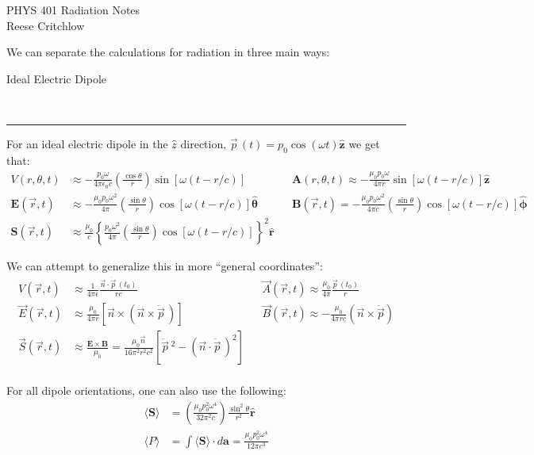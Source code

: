 \documentclass{article}
\newcommand{\header}[1]{\begin{large}\noindent #1\end{large}\\\rule{\textwidth}{0.5pt}}
\newcommand{\gap}{\medskip\\}
\newcommand{\curly}[1]{\left\{#1\right\}}
\begin{document}
\begin{center}
    \Large PHYS 401 Radiation Notes\\
    \normalsize Reese Critchlow
\end{center}
    
We can separate the calculations for radiation in three main ways:
\gap
\header{Ideal Electric Dipole}
For an ideal electric dipole in the $\hat{z}$ direction, $\vec{p}\,(t) = p_0\cos(\omega t)\hat{\pmb{z}}$ we get that:
\begin{align*}
    V(r, \theta, t) &\approx -\frac{p_0 \omega}{4\pi \epsilon_0c}\left(\frac{\cos \theta}{r}\right) \sin \left[\omega(t- r/c)\right]
    && \mathbf{A}(r, \theta, t) \approx -\frac{\mu_0 p_0 \omega}{4\pi r} \sin \left[\omega(t - r/c)\right]\hat{\pmb{z}}\\
    \mathbf{E}(\vec{r}, t) &\approx -\frac{\mu_0 p_0 \omega^2}{4\pi}\left(\frac{\sin\theta}{r}\right)\cos\left[\omega(t- r/c)\right] \hat{\pmb{\theta}}
    && \mathbf{B}(\vec{r}, t) = - \frac{\mu_0 p_0 \omega^2}{4\pi c}\left(\frac{\sin\theta}{r}\right)\cos\left[\omega(t- r/c)\right]\hat{\pmb{\phi}}\\
    \mathbf{S}(\vec{r}, t) &\approx \frac{\mu_0}{c}\curly{\frac{p_0\omega^2}{4\pi} \left(\frac{\sin\theta}{r}\right)\cos[\omega(t-r/c)]}^2 \hat{\pmb{r}}
\end{align*}

We can attempt to generalize this in more ``general coordinates'':
\begin{align*}
    V(\vec{r}, t) &\approx \frac{1}{4\pi \epsilon} \frac{\vec{n} \cdot \dot{\vec{p}}\,(t_0)}{rc} && \vec{A}(\vec{r}, t) \approx \frac{\mu_0 }{4\pi} \frac{\dot{\vec{p}}\,(t_0)}{r}\\
    \vec{E}(\vec{r}, t) &\approx \frac{\mu_0}{4\pi r}\left[\vec{n} \times (\vec{n} \times \ddot{\vec{p}}\,)\right]&&
    \vec{B}(\vec{r}, t) \approx -\frac{\mu_0}{4\pi rc}\left(\vec{n} \times \ddot{\vec{p}}\right)\\
    \vec{S}(\vec{r}, t) &\approx \frac{\mathbf{E} \times \mathbf{B}}{\mu_0} = \frac{\mu_0 \vec{n}}{16\pi^2 r^2c^2}\left[\ddot{\vec{p}}\,^2 - (\vec{n} \cdot \ddot{\vec{p}}\,)^2\right]
\end{align*}
\gap 
For all dipole orientations, one can also use the following:
\begin{align*}
    \langle \mathbf{S} \rangle &= \left(\frac{\mu_0 p_0^2 \omega^4}{32 \pi^2 c}\right)\frac{\sin^2\theta}{r^2}\pmb{\hat{r}}\\
    \langle P \rangle &= \int \langle \mathbf{S} \rangle \cdot d \mathbf{a} = \frac{\mu_0 p_0^2 \omega^4}{12 \pi c^3}
\end{align*}
\end{document}
